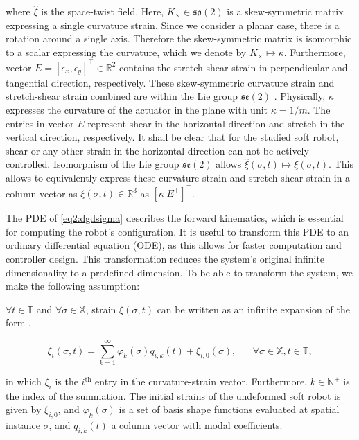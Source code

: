 where $\hat{\xi}$ is the space-twist field. Here, $K_\times \in \mathfrak{so}(2)$ is a skew-symmetric matrix expressing a single curvature strain. Since we consider a planar case, there is a rotation around a single axis. Therefore the skew-symmetric matrix is isomorphic to a scalar expressing the curvature, which we denote by $K_\times \longmapsto \kappa$. Furthermore, vector $E = [\epsilon_x,\epsilon_y]^\top \in \mathbb{R}^2$ contains the stretch-shear strain in perpendicular and tangential direction, respectively. These skew-symmetric curvature strain and stretch-shear strain combined are within the Lie group $\mathfrak{se}(2)$ \cite{Sola2018}. Physically, $\kappa$ expresses the curvature of the actuator in the plane with unit $\kappa = 1/m$. The entries in vector $E$ represent shear in the horizontal direction and stretch in the vertical direction, respectively. It shall be clear that for the studied soft robot, shear or any other strain in the horizontal direction can not be actively controlled. Isomorphism of the Lie group $\mathfrak{se}(2)$ allows $\hat{\xi}(\sigma,t) \longmapsto \xi(\sigma,t)$. This allows to equivalently express these curvature strain and stretch-shear strain in a column vector as $\xi(\sigma,t) \in \mathbb{R}^3$ as $[\kappa \hspace{3pt} E^\top ]^\top$.

The PDE of \ref{eq2:dgdsigma} describes the forward kinematics, which is essential for computing the robot's configuration. It is useful to transform this PDE to an ordinary differential equation (ODE), as this allows for faster computation and controller design. This transformation reduces the system's original infinite dimensionality to a predefined dimension. To be able to transform the system, we make the following assumption: 

\begin{theorem}

$\forall t \in \mathbb{T}$ and $\forall \sigma \in \mathbb{X}$, strain $\xi(\sigma,t)$ can be written as an infinite expansion of the form \cite{Caasenbrood2021},

\begin{equation}
\xi_i(\sigma,t) = \sum_{k=1}^\infty \varphi_k(\sigma)q_{i,k}(t) + \xi_{i,0}(\sigma), \hspace{20pt} \forall \sigma \in \mathbb{X}, t \in \mathbb{T},
\label{eq2:strainexact}
\end{equation}

in which $\xi_{i}$ is the $i^{\text{th}}$ entry in the curvature-strain vector. Furthermore, $k \in \mathbb{N}^+$ is the index of the summation. The initial strains of the undeformed soft robot is given by $\xi_{i,0}$, and $\varphi_k(\sigma)$ is a set of basis shape functions evaluated at spatial instance $\sigma$, and $q_{i,k}(t)$ a column vector with modal coefficients. 
\end{theorem}

